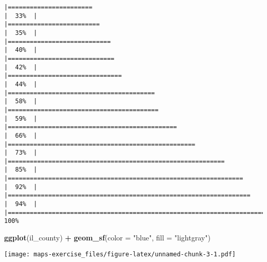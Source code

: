 \documentclass[
]{article}
\newenvironment{Shaded}{\begin{snugshade}}{\end{snugshade}}
\newcommand{\AttributeTok}[1]{\textcolor[rgb]{0.13,0.29,0.53}{#1}}
\newcommand{\FunctionTok}[1]{\textcolor[rgb]{0.13,0.29,0.53}{\textbf{#1}}}
\newcommand{\NormalTok}[1]{#1}
\newcommand{\SpecialCharTok}[1]{\textcolor[rgb]{0.81,0.36,0.00}{\textbf{#1}}}
\newcommand{\StringTok}[1]{\textcolor[rgb]{0.31,0.60,0.02}{#1}}
\begin{document}
\begin{verbatim}
|=======================                                               |  33%  |                                                                              |=========================                                             |  35%  |                                                                              |============================                                          |  40%  |                                                                              |=============================                                         |  42%  |                                                                              |===============================                                       |  44%  |                                                                              |========================================                              |  58%  |                                                                              |=========================================                             |  59%  |                                                                              |==============================================                        |  66%  |                                                                              |===================================================                   |  73%  |                                                                              |===========================================================           |  85%  |                                                                              |================================================================      |  92%  |                                                                              |==================================================================    |  94%  |                                                                              |======================================================================| 100%
\end{verbatim}

\begin{Shaded}
\begin{Highlighting}[]
\FunctionTok{ggplot}\NormalTok{(il\_county) }\SpecialCharTok{+} 
  \FunctionTok{geom\_sf}\NormalTok{(}\AttributeTok{color =} \StringTok{"blue"}\NormalTok{, }\AttributeTok{fill =} \StringTok{"lightgray"}\NormalTok{) }
\end{Highlighting}
\end{Shaded}

\texttt{[image: maps-exercise\_files/figure-latex/unnamed-chunk-3-1.pdf]}
\end{document}
